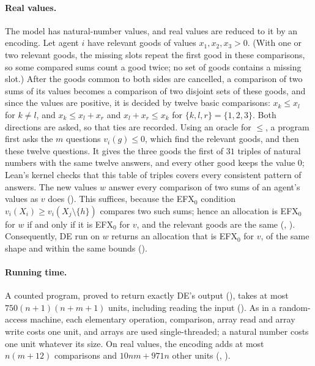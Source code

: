 \documentclass[runningheads,11pt]{llncs}
\newcommand{\efxz}{\texorpdfstring{\mbox{EFX$_0$}}{EFX0}}
\newcommand{\DE}{\textup{DE}}
\begin{document}
\paragraph{Real values.} The model has natural-number values, and real values are reduced to it by an encoding. Let agent $i$ have relevant goods of values $x_1,x_2,x_3>0$. (With one or two relevant goods, the missing slots repeat the first good in these comparisons, so some compared sums count a good twice; no set of goods contains a missing slot.) After the goods common to both sides are cancelled, a comparison of two sums of its values becomes a comparison of two disjoint sets of these goods, and since the values are positive, it is decided by twelve basic comparisons: $x_k\le x_l$ for $k\ne l$, and $x_k\le x_l+x_r$ and $x_l+x_r\le x_k$ for $\{k,l,r\}=\{1,2,3\}$. Both directions are asked, so that ties are recorded. Using an oracle for $\le$, a program first asks the $m$ questions $v_i(g)\le0$, which find the relevant goods, and then these twelve questions. It gives the three goods the first of $31$ triples of natural numbers with the same twelve answers, and every other good keeps the value $0$; Lean's kernel checks that this table of triples covers every consistent pattern of answers. The new values $w$ answer every comparison of two sums of an agent's values as $v$ does (). This suffices, because the \efxz{} condition $v_i(X_i)\ge v_i(X_j\setminus\{h\})$ compares two such sums; hence an allocation is \efxz{} for $w$ if and only if it is \efxz{} for $v$, and the relevant goods are the same (, ). Consequently, \DE{} run on $w$ returns an allocation that is \efxz{} for $v$, of the same shape and within the same bounds ().

\paragraph{Running time.} A counted program, proved to return exactly \DE{}'s output (), takes at most $750(n+1)(n+m+1)$ units, including reading the input (). As in a random-access machine, each elementary operation, comparison, array read and array write costs one unit, and arrays are used single-threaded; a natural number costs one unit whatever its size. On real values, the encoding adds at most $n(m+12)$ comparisons and $10nm+971n$ other units (, ).
\end{document}
